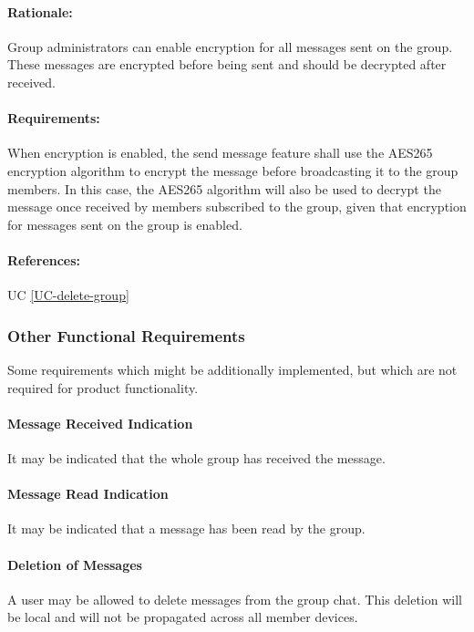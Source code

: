 \documentclass[11pt]{article}
\begin{document}
\paragraph{Rationale:} Group administrators can enable encryption for all messages sent on the group. These messages are encrypted before being sent and should be decrypted after received.
\paragraph{Requirements:} When encryption is enabled, the send message feature shall use the AES265 encryption algorithm to encrypt the message before broadcasting it to the group members. In this case, the AES265 algorithm will also be used to decrypt the message once received by members subscribed to the group, given that encryption for messages sent on the group is enabled.
\paragraph{References:} UC \ref{UC-delete-group}

\subsubsection{Other Functional Requirements}	\label{FR-nice-to-have}
Some requirements which might be additionally implemented, but which are not required for product functionality.
\paragraph{Message Received Indication} It may be indicated that the whole group has received the message.
\paragraph{Message Read Indication} It may be indicated that a message has been read by the group.
\paragraph{Deletion of Messages} A user may be allowed to delete messages from the group chat. This deletion will be local  and will not be propagated across all member devices.
\end{document}
